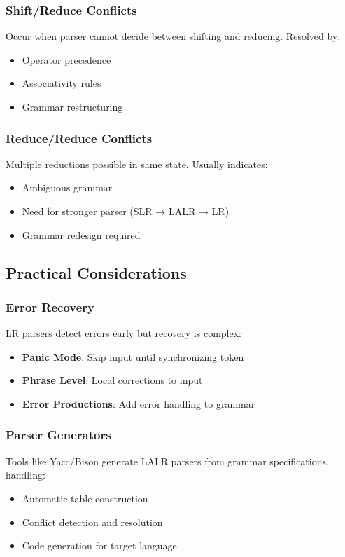 \subsubsection{Shift/Reduce Conflicts}
Occur when parser cannot decide between shifting and reducing. Resolved by:
\begin{itemize}
    \item Operator precedence
    \item Associativity rules
    \item Grammar restructuring
\end{itemize}

\subsubsection{Reduce/Reduce Conflicts}
Multiple reductions possible in same state. Usually indicates:
\begin{itemize}
    \item Ambiguous grammar
    \item Need for stronger parser (SLR → LALR → LR)
    \item Grammar redesign required
\end{itemize}

\subsection{Practical Considerations}

\subsubsection{Error Recovery}
LR parsers detect errors early but recovery is complex:
\begin{itemize}
    \item \textbf{Panic Mode}: Skip input until synchronizing token
    \item \textbf{Phrase Level}: Local corrections to input
    \item \textbf{Error Productions}: Add error handling to grammar
\end{itemize}

\subsubsection{Parser Generators}
Tools like Yacc/Bison generate LALR parsers from grammar specifications, handling:
\begin{itemize}
    \item Automatic table construction
    \item Conflict detection and resolution
    \item Code generation for target language
\end{itemize}